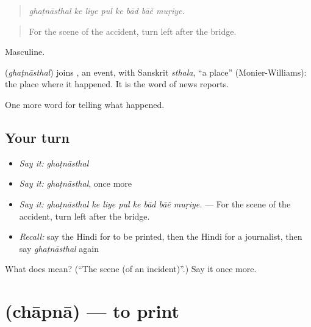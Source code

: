 \begin{quote}
\emph{ghaṭnāsthal ke liye pul ke bād bāẽ muṛiye.}
\end{quote}

\begin{quote}
For the scene of the accident, turn left after the bridge.
\end{quote}

Masculine.

\begin{cousinweb}
\textbf{} (\emph{ghaṭnāsthal}) joins \textbf{}, an event, with Sanskrit \emph{sthala}, \textquotedblleft{}a place\textquotedblright{} (Monier-Williams): the place where it happened. It is the word of news reports.
\end{cousinweb}

\begin{grammarlens}[title={What you've built}]
One more word for telling what happened.
\end{grammarlens}

\subsection*{Your turn}
\begin{itemize}
\raggedright
  \item \emph{Say it:} \emph{ghaṭnāsthal}
  \item \emph{Say it:} \emph{ghaṭnāsthal}, once more
  \item \emph{Say it:} \emph{ghaṭnāsthal ke liye pul ke bād bāẽ muṛiye.} — For the scene of the accident, turn left after the bridge.
  \item \emph{Recall:} say the Hindi for to be printed, then the Hindi for a journalist, then say \emph{ghaṭnāsthal} again
\end{itemize}

\begin{tcolorbox}[breakable,colback=teal!4,colframe=teal!35!black,title={Before you move on}]
What does  mean? (\textquotedblleft{}The scene (of an incident)\textquotedblright{}.) Say it once more.
\end{tcolorbox}
\section[\texorpdfstring{\hi{छापना} (chāpnā)}{छापना (chāpnā)}]{ (chāpnā) — to print}

\label{lesson:HI-C313-chaapna}



